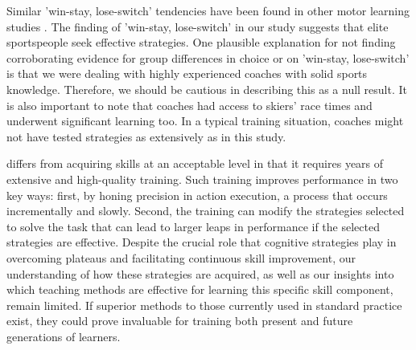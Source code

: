 Similar 'win-stay, lose-switch' tendencies have been found in other motor learning studies \cite{taylor_flexible_2011}. The finding of 'win-stay, lose-switch' in our study suggests that elite sportspeople seek effective strategies. One plausible explanation for not finding corroborating evidence for group differences in choice or on 'win-stay, lose-switch' is that we were dealing with highly experienced coaches with solid sports knowledge. Therefore, we should be cautious in describing this as a null result. It is also important to note that coaches had access to skiers' race times and underwent significant learning too. In a typical training situation, coaches might not have tested strategies as extensively as in this study.  






differs from acquiring skills at an acceptable level in that it requires years of extensive and high-quality training. Such training improves performance in two key ways: first, by honing precision in action execution, a process that occurs incrementally and slowly. Second, the training can modify the strategies selected to solve the task that can lead to larger leaps in performance if the selected strategies are effective. Despite the crucial role that cognitive strategies play in overcoming plateaus and facilitating continuous skill improvement, our understanding of how these strategies are acquired, as well as our insights into which teaching methods are effective for learning this specific skill component, remain limited. If superior methods to those currently used in standard practice exist, they could prove invaluable for training both present and future generations of learners.




